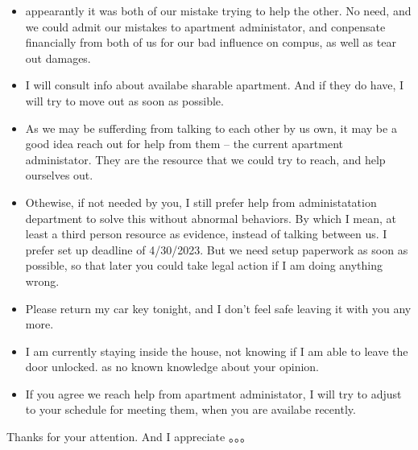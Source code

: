 \documentclass[9pt, b5paper]{article}
\begin{document}
\begin{itemize}
\item appearantly it was both of our mistake trying to help the other. No need, and we could admit our mistakes to apartment administator, and conpensate financially from both of us for our bad influence on compus, as well as tear out damages.

\item I will consult info about availabe sharable apartment. And if they do have, I will try to move out as soon as possible.

\item As we may be sufferding from talking to each other by us own, it may be a good idea reach out for help from them -- the current apartment administator. They are the resource that we could try to reach, and help ourselves out.

\item Othewise, if not needed by you, I still prefer help from administatation department to solve this without abnormal behaviors. By which I mean, at least a third person resource as evidence, instead of talking between us. I prefer set up deadline of 4/30/2023. But we need setup paperwork as soon as possible, so that later you could take legal action if I am doing anything wrong.

\item Please return my car key tonight, and I don't feel safe leaving it with you any more.

\item I am currently staying inside the house, not knowing if I am able to leave the door unlocked. as no known knowledge about your opinion.

\item If you agree we reach help from apartment administator, I will try to adjust to your schedule for meeting them, when you are availabe recently.
\end{itemize}

Thanks for your attention. And I appreciate 。。。
\end{document}
